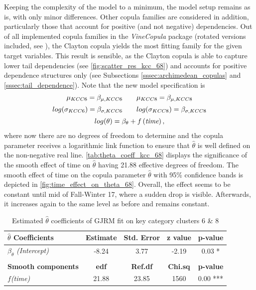 Keeping the complexity of the model to a minimum, the model setup remains as is, with only minor differences. Other copula families are considered in addition, particularly those that account for positive (and not negative) dependencies. Out of all implemented copula families in the \textit{VineCopula} package (rotated versions included, see \cite{nagler2019vinecopula}), the Clayton copula yields the most fitting family for the given target variables. This result is sensible, as the Clayton copula is able to capture lower tail dependencies (see \autoref{fig:scatter_res_kcc_68}) and accounts for positive dependence structures only (see Subsections \ref{sssec:archimedean_copulas} and \ref{sssec:tail_dependence}). Note that the new model specification is 
\begin{equation}
\begin{array}{c}
\mu_{KCC 6}=\beta_{\mu,KCC6} \qquad \mu_{KCC 8}=\beta_{\mu,KCC8}  \\  \noalign{\vskip5pt}

log(\sigma_{KCC 6})=\beta_{\sigma,KCC6} \qquad log(\sigma_{KCC 8})=\beta_{\sigma,KCC8} \\  \noalign{\vskip5pt}


log(\theta)=\beta_{\theta}+f\left(\textit{time}\right),
\end{array}
\label{eq:gjrm_formula_68}
\end{equation}
where now there are no degrees of freedom to determine and the copula parameter receives a logarithmic link function to ensure that $\hat{\theta}$ is well defined on the non-negative real line. \autoref{tab:theta_coeff_kcc_68} displays the significance of the smooth effect of time on $\hat{\theta}$ having 21.88 effective degrees of freedom. The smooth effect of time on the copula parameter $\hat{\theta}$ with 95\% confidence bands is depicted in \autoref{fig:time_effect_on_theta_68}. Overall, the effect seems to be constant until mid of Fall-Winter 17, where a sudden drop is visible. Afterwards, it increases again to the same level as before and remains constant.



\begin{table}[H]
\centering
\begin{tabular}{l|c|c|c|c}
\hline
                               \textbf{$\hat{\theta}$ Coefficients}       & \textbf{Estimate} & \textbf{Std. Error} & \textbf{z value} & \textbf{p-value}  \\ \hline\hline
$\beta_{\theta}$ \textit{(Intercept)}                  & -8.24     & 3.77       & -2.19    & 0.03 *   \\ \hline
& & & & \\ \hline
\textbf{Smooth components}            & \textbf{edf}      & \textbf{Ref.df}     & \textbf{Chi.sq}  & \textbf{p-value}  \\ \hline\hline
\textit{$f$(time)}                 & 21.88    & 23.85      & 1560   & 0.00 *** \\ \hline
\end{tabular}
\caption{Estimated $\hat{\theta}$ coefficients of \ac{GJRM} fit on key category clusters 6 \& 8}
\label{tab:theta_coeff_kcc_68}
\end{table}



